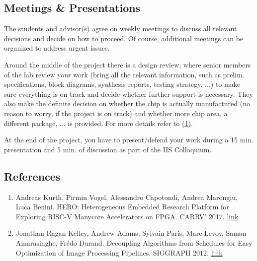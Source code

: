 \subsection{Meetings \& Presentations}

The students and advisor(s) agree on weekly meetings to discuss all
relevant decisions and decide on how to proceed. Of course, additional
meetings can be organized to address urgent issues.

Around the middle of the project there is a design review, where senior
members of the lab review your work (bring all the relevant information,
such as prelim. specifications, block diagrams, synthesis reports,
testing strategy, ...) to make sure everything is on track and decide
whether further support is necessary. They also make the definite
decision on whether the chip is actually manufactured (no reason to
worry, if the project is on track) and whether more chip area, a
different package, ... is provided. For more details refer to
\href{http://eda.ee.ethz.ch/index.php/Design_review}{(1)}.

At the end of the project, you have to present/defend your work during a
15 min. presentation and 5 min. of discussion as part of the IIS
Colloquium.

\subsection{References}

\begin{enumerate}
\item
  Andreas Kurth, Pirmin Vogel, Alessandro Capotondi, Andrea Marongiu,
  Luca Benini. HERO: Heterogeneous Embedded Research Platform for
  Exploring RISC-V Manycore Accelerators on FPGA. CARRV' 2017.
  \href{https://doi.org/10.3929/ethz-b-000219249}{link}
\item
  Jonathan Ragan-Kelley, Andrew Adams, Sylvain Paris, Marc Levoy, Saman
  Amarasinghe, Frédo Durand. Decoupling Algorithms from Schedules for
  Easy Optimization of Image Processing Pipelines. SIGGRAPH 2012.
  \href{http://people.csail.mit.edu/jrk/halide12}{link}
\end{enumerate}
